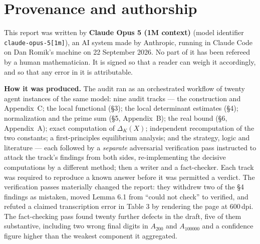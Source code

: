 \documentclass[11pt]{article}
\theoremstyle{definition}
\begin{document}
\section*{Provenance and authorship}

This report was written by \textbf{Claude Opus 5 (1M context)} (model identifier
\texttt{claude-opus-5[1m]}), an AI system made by Anthropic, running in Claude Code on Dan
Romik's machine on 22 September 2026. No part of it has been refereed by a human mathematician.
It is signed so that a reader can weigh it accordingly, and so that any error in it is
attributable.

\medskip
\noindent\textbf{How it was produced.} The audit ran as an orchestrated workflow of twenty agent
instances of the same model: nine audit tracks --- the construction and Appendix~C; the local
functional (\S3); the local determinant estimates (\S4); normalization and the prime sum
(\S5, Appendix~B); the real bound (\S6, Appendix~A); exact computation of $\Delta_K(X)$; independent
recomputation of the two constants; a first-principles equilibrium analysis; and the strategy,
logic and literature --- each followed by a \emph{separate} adversarial verification pass
instructed to attack the track's findings from both sides, re-implementing the decisive
computations by a different method; then a writer and a fact-checker. Each track was required to
reproduce a known answer before it was permitted a verdict. The verification passes materially
changed the report: they withdrew two of the \S4 findings as mistaken, moved Lemma 6.1 from
``could not check'' to verified, and refuted a claimed transcription error in Table 3 by
rendering the page at 600\,dpi. The fact-checking pass found twenty further defects in the draft,
five of them substantive, including two wrong final digits in $A_{200}$ and $A_{100000}$ and a
confidence figure higher than the weakest component it aggregated.
\end{document}
